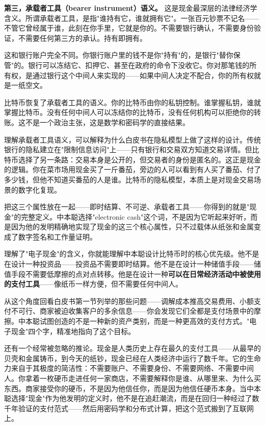 \documentclass[a4paper,12pt,openany]{ctexbook}
\begin{document}
\textbf{第三，承载者工具（bearer instrument）语义。} 这是现金最深层的法律经济学含义。所谓承载者工具，是指"谁持有它，谁就拥有它"。一张百元钞票不记名——不管它曾经属于谁，此刻在你手里，它就是你的。不需要银行确认，不需要身份验证，不需要任何第三方的承认。持有即拥有。

这和银行账户完全不同。你银行账户里的钱不是你"持有"的，是银行"替你保管"的。银行可以冻结它、扣押它、甚至在政府的命令下没收它。你对那笔钱的所有权，是通过银行这个中间人来实现的——如果中间人决定不配合，你的所有权就是一纸空文。

比特币恢复了承载者工具的语义。你的比特币由你的私钥控制。谁掌握私钥，谁就掌握比特币。没有任何中间人可以冻结你的比特币，没有任何机构可以拒绝你的转账。这不是一个政治主张，这是数学和密码学的直接结果。

理解承载者工具语义，可以解释为什么白皮书在隐私模型上做了这样的设计。传统银行的隐私建立在"限制信息访问"上——只有银行和交易双方知道交易详情。但比特币选择了另一条路：交易本身是公开的，但交易者的身份是匿名的。这正是现金的逻辑。你在菜市场用现金买了一斤番茄，旁边的人可以看到有人买了番茄、付了多少钱，但他不知道买番茄的人是谁。比特币的隐私模型，本质上是对现金交易场景的数字化复现。

把这三个属性放在一起——即时结算、不可逆、承载者工具——你得到的就是"现金"的完整定义。中本聪选择"electronic cash"这个词，不是因为它听起来好听，而是因为他的发明精确地实现了现金的这三个核心属性，只不过载体从纸张和金属变成了数字签名和工作量证明。

理解了"电子现金"的含义，你就能理解中本聪设计比特币时的核心优先级。他不是在设计一种投资品——投资品不需要即时结算。他不是在设计一种储值手段——储值手段不需要低摩擦的点对点转移。他是在设计一种\textbf{可以在日常经济活动中被使用的支付工具}——像纸币一样方便，但不需要任何中间人。

从这个角度回看白皮书第一节列举的那些问题——调解成本推高交易费用、小额支付不可行、商家被迫收集客户的多余信息——你会发现它们全都是支付场景中的摩擦。中本聪试图创造的不是一种新的资产类别，而是一种更高效的支付方式。"电子现金"四个字，精准地指向了这个目标。

还有一个经常被忽略的推论。现金是人类历史上存在最久的支付工具——从最早的贝壳和金属铸币，到今天的纸钞，现金已经在人类经济中运行了数千年。它的生命力来自于其极度的简洁性：不需要账户、不需要身份、不需要网络、不需要中间人。你拿着一枚硬币走进任何一家商店，不需要解释你是谁、从哪里来、为什么买东西。商家接受你的硬币，不是因为他信任你，而是因为他信任硬币本身。当中本聪选择"现金"作为他发明的定义时，他不是在追赶潮流，而是在回归一种经过了数千年验证的支付范式——然后用密码学和分布式计算，把这个范式搬到了互联网上。
\end{document}
